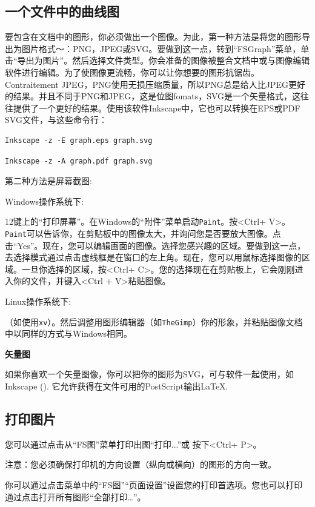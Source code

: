 \subsection{一个文件中的曲线图}
要包含在文档中的图形，你必须做出一个图像。为此，第一种方法是将您的图形导出为图片格式〜：PNG，JPEG或SVG。要做到这一点，转到“FSGraph”菜单，单击“导出为图片”。然后选择文件类型。你会准备的图像被整合文档中或与图像编辑软件进行编辑。为了使图像更流畅，你可以让你想要的图形抗锯齿。 Contraitement JPEG，PNG使用无损压缩质量，所以PNG总是给人比JPEG更好的结果。并且不同于PNG和JPEG，这是位图fomats，SVG是一个矢量格式，这往往提供了一个更好的结果。使用该软件Inkscape中，它也可以转换在EPS或PDF SVG文件，与这些命令行：
\begin{verbatim}
Inkscape -z -E graph.eps graph.svg
\end{verbatim}
\begin{verbatim}
Inkscape -z -A graph.pdf graph.svg
\end{verbatim}

\bigskip
\noindent 第二种方法是屏幕截图:

\bigskip
\noindent Windows操作系统下:

\bigskip
{}12键上的“打印屏幕”。在Windows的“附件”菜单启动\verb+Paint+。按<Ctrl+ V>。 \verb+Paint+可以告诉你，在剪贴板中的图像太大，并询问您是否要放大图像。点击“Yes”。现在，您可以编辑画面的图像。选择您感兴趣的区域。要做到这一点，去选择模式通过点击虚线框是在窗口的左上角。现在，您可以用鼠标选择图像的区域。一旦你选择的区域，按<Ctrl+ C>。您的选择现在在剪贴板上，它会刚刚进入你的文件，并键入<Ctrl + V>粘贴图像。


\bigskip
\noindent Linux操作系统下:

\bigskip
{}（如使用\verb+xv+）。然后调整用图形编辑器（如\verb+TheGimp+）你的形象，并粘贴图像文档中以同样的方式与Windows相同。

\bigskip
\noindent \textbf{矢量图}

\bigskip
\noindent 如果你喜欢一个矢量图像，你可以把你的图形为SVG，可与软件一起使用，如Inkscape (\cite{Inkscape}).
它允许获得在文件可用的PostScript输出\LaTeX.

\subsection{打印图片}

您可以通过点击从“FS图”菜单打印出图“打印...”或
按下<Ctrl+ P>。

\bigskip
\noindent 注意：您必须确保打印机的方向设置（纵向或横向）的图形的方向一致。


\bigskip
\noindent 你可以通过点击菜单中的“FS图”“页面设置”设置您的打印首选项。您也可以打印通过点击打开所有图形“全部打印…”。


